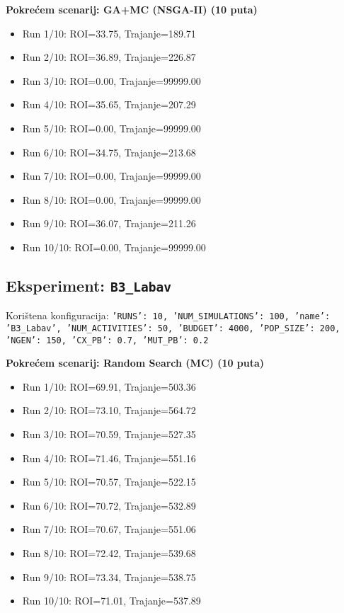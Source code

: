 \textbf{Pokrećem scenarij: GA+MC (NSGA-II) (10 puta)}
\begin{itemize}
    \item Run 1/10: ROI=33.75, Trajanje=189.71
    \item Run 2/10: ROI=36.89, Trajanje=226.87
    \item Run 3/10: ROI=0.00, Trajanje=99999.00
    \item Run 4/10: ROI=35.65, Trajanje=207.29
    \item Run 5/10: ROI=0.00, Trajanje=99999.00
    \item Run 6/10: ROI=34.75, Trajanje=213.68
    \item Run 7/10: ROI=0.00, Trajanje=99999.00
    \item Run 8/10: ROI=0.00, Trajanje=99999.00
    \item Run 9/10: ROI=36.07, Trajanje=211.26
    \item Run 10/10: ROI=0.00, Trajanje=99999.00
\end{itemize}

\subsection*{Eksperiment: \texttt{B3\_Labav}}
Korištena konfiguracija: \texttt{'RUNS': 10, 'NUM\_SIMULATIONS': 100, 'name': 'B3\_Labav', 'NUM\_ACTIVITIES': 50, 'BUDGET': 4000, 'POP\_SIZE': 200, 'NGEN': 150, 'CX\_PB': 0.7, 'MUT\_PB': 0.2}

\textbf{Pokrećem scenarij: Random Search (MC) (10 puta)}
\begin{itemize}
    \item Run 1/10: ROI=69.91, Trajanje=503.36
    \item Run 2/10: ROI=73.10, Trajanje=564.72
    \item Run 3/10: ROI=70.59, Trajanje=527.35
    \item Run 4/10: ROI=71.46, Trajanje=551.16
    \item Run 5/10: ROI=70.57, Trajanje=522.15
    \item Run 6/10: ROI=70.72, Trajanje=532.89
    \item Run 7/10: ROI=70.67, Trajanje=551.06
    \item Run 8/10: ROI=72.42, Trajanje=539.68
    \item Run 9/10: ROI=73.34, Trajanje=538.75
    \item Run 10/10: ROI=71.01, Trajanje=537.89
\end{itemize}


